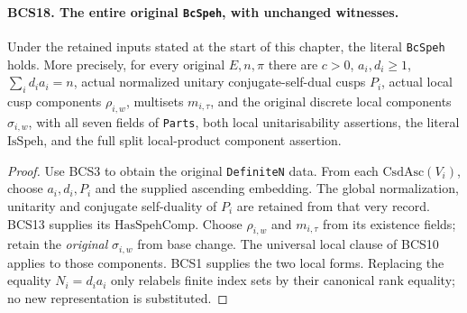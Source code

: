 \documentclass[11pt,a4paper]{article}
\numberwithin{equation}{section}
\theoremstyle{remark}\newtheorem{remark}[theorem]{Remark}
\begin{document}
\paragraph{BCS18. The entire original \texttt{Bc\allowbreak Speh}, with unchanged witnesses.}
\label{claim:BCS18}
Under the retained inputs stated at the start of this chapter, the
literal \texttt{Bc\allowbreak Speh} holds.  More precisely, for every original
\(E,n,\pi\) there are \(c>0\), \(a_i,d_i\ge1\),
\(\sum_i d_i a_i=n\), actual normalized unitary conjugate-self-dual
cusps \(P_i\), actual local cusp components \(\rho_{i,w}\),
multisets \(m_{i,\tau}\), and the original discrete local components
\(\sigma_{i,w}\), with all seven fields of \texttt{Parts}, both
local unitarisability assertions, the literal \(\mathrm{IsSpeh}\),
and the full split local-product component assertion.
\begin{proof}
Use BCS3 to obtain the original \texttt{Definite\allowbreak N} data.  From each
\(\mathrm{CsdAsc}(V_i)\), choose \(a_i,d_i,P_i\) and the
supplied ascending embedding.  The global normalization, unitarity
and conjugate self-duality of \(P_i\) are retained from that very
record.  BCS13 supplies its \(\mathrm{HasSpehComp}\).  Choose
\(\rho_{i,w}\) and \(m_{i,\tau}\) from its existence fields;
retain the \emph{original} \(\sigma_{i,w}\) from base change.
The universal local clause of BCS10 applies to those components.
BCS1 supplies the two local forms.  Replacing the equality
\(N_i=d_i a_i\) only relabels finite index sets by their canonical
rank equality; no new representation is substituted.


\end{proof}
\end{document}
